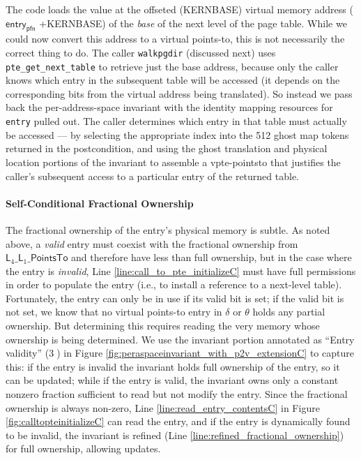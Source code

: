 The code loads the value at the offseted (\textsf{KERNBASE}) virtual memory address ($\textsf{entry}_{\textsf{pfn}}$ \textsf{+KERNBASE})
of the \emph{base} of the next level of the page table.
While we could now convert this address to a virtual points-to, this is not necessarily the correct thing to do.
The caller \lstinline|walkpgdir| (discussed next) uses \lstinline|pte_get_next_table| to retrieve just the base address,
because only the caller knows which entry in the subsequent table will be accessed (it depends on the corresponding bits from the virtual
address being translated). So instead we pass back the per-address-space invariant with the identity mapping resources for \lstinline|entry|
pulled out. The caller determines which entry in that table must actually
be accessed --- by selecting the appropriate index into the 512 ghost map tokens returned in the postcondition,
and using the ghost translation and physical location portions of the invariant to assemble a vpte-pointsto
that justifies the caller's subsequent access to a particular entry of the returned table.



\paragraph{Self-Conditional Fractional Ownership}
The fractional ownership of the entry's physical memory is subtle.
As noted above, a \emph{valid} entry must coexist with the fractional ownership from
$\textsf{L}_{4}\_\textsf{L}_{1}\_\textsf{PointsTo}$ and therefore have less than full ownership,
but in the case where the entry is \emph{invalid}, Line \ref{line:call_to_pte_initializeC} must have full permissions in order
to populate the entry (i.e., to install a reference to a next-level table).
Fortunately, the entry can only be in use if its valid bit is set; if the valid bit is not set, we know
that no virtual points-to entry in $\delta$ or $\theta$ holds any partial ownership.
But determining this requires reading the very memory whose ownership is being determined.
We use the invariant portion annotated as ``Entry validity'' (\textcircled{3}) in Figure \ref{fig:peraspaceinvariant_with_p2v_extensionC} to capture this:
if the entry is invalid the invariant holds full ownership of the entry, so it can be updated;
while if the entry is valid, the invariant owns only a constant nonzero fraction sufficient to read but not modify the entry.
Since the fractional ownership is always non-zero, Line \ref{line:read_entry_contentsC} in Figure \ref{fig:calltopteinitializeC} can read the entry,
and if the entry is dynamically found to be invalid, the invariant is refined (Line \ref{line:refined_fractional_ownership}) for full
ownership, allowing updates.

